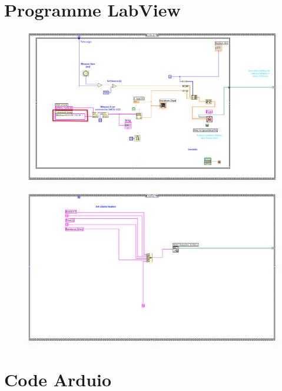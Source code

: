 \documentclass[
    iai & comatec, %
    mi, %
]{heig-tb}
\begin{document}
\section{Programme LabView}
\begin{figure}[H]
    \hspace{-1cm}
    \includegraphics[scale = 0.5]{assets/figures/LabView1.PNG}
\end{figure}
\begin{figure}[H]
    \hspace{-1cm}
    \includegraphics[scale = 0.5]{assets/figures/LabView2.PNG}
\end{figure}

\section{Code Arduio}


\newpage
\end{document}
